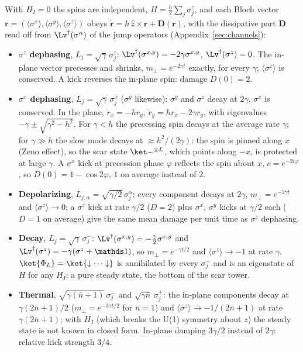 With $H_I = 0$ the spins are independent, $H = \tfrac h2\sum_j\sigma^z_j$, and each Bloch vector $\mathbf r = (\langle\sigma^x\rangle, \langle\sigma^y\rangle, \langle\sigma^z\rangle)$ obeys $\dot{\mathbf r} = h\,\hat z\times\mathbf r + \mathbf D(\mathbf r)$, with the dissipative part $\mathbf D$ read off from $\Lv^\dagger(\sigma^\alpha)$ of the jump operators (Appendix~\ref{sec:channels}):
\begin{itemize}
\item \textbf{$\sigma^z$ dephasing}, $L_j = \sqrt\gamma\,\sigma^z_j$: $\Lv^\dagger(\sigma^{x,y}) = -2\gamma\sigma^{x,y}$, $\Lv^\dagger(\sigma^z) = 0$. The in-plane vector precesses and shrinks, $m_\perp = e^{-2\gamma t}$ exactly, for every $\gamma$; $\langle\sigma^z\rangle$ is conserved. A kick reverses the in-plane spin: damage $D(0) = 2$.
\item \textbf{$\sigma^x$ dephasing}, $L_j = \sqrt\gamma\,\sigma^x_j$ ($\sigma^y$ likewise): $\sigma^y$ and $\sigma^z$ decay at $2\gamma$, $\sigma^x$ is conserved. In the plane, $\dot r_x = -hr_y$, $\dot r_y = hr_x - 2\gamma r_y$, with eigenvalues $-\gamma \pm \sqrt{\gamma^2 - h^2}$. For $\gamma < h$ the precessing spin decays at the average rate $\gamma$; for $\gamma \gg h$ the slow mode decays at $\approx h^2/(2\gamma)$: the spin is pinned along $x$ (Zeno effect), so the scar state $\ket-^{\otimes L}$, which points along $-x$, is protected at large $\gamma$. A $\sigma^x$ kick at precession phase $\varphi$ reflects the spin about $x$, $c = e^{-2i\varphi}$, so $D(0) = 1 - \cos2\varphi$, $1$ on average instead of $2$.
\item \textbf{Depolarizing}, $L_{j,\alpha} = \sqrt{\gamma/2}\,\sigma^\alpha_j$: every component decays at $2\gamma$, $m_\perp = e^{-2\gamma t}$ and $\langle\sigma^z\rangle \to 0$; a $\sigma^z$ kick at rate $\gamma/2$ ($D = 2$) plus $\sigma^x$, $\sigma^y$ kicks at $\gamma/2$ each ($D = 1$ on average) give the same mean damage per unit time as $\sigma^z$ dephasing.
\item \textbf{Decay}, $L_j = \sqrt\gamma\,\sigma^-_j$: $\Lv^\dagger(\sigma^{x,y}) = -\tfrac\gamma2\sigma^{x,y}$ and $\Lv^\dagger(\sigma^z) = -\gamma(\sigma^z + \mathds 1)$, so $m_\perp = e^{-\gamma t/2}$ and $\langle\sigma^z\rangle \to -1$ at rate $\gamma$. $\ket{\Phi_L} = \ket{\downarrow\cdots\downarrow}$ is annihilated by every $\sigma^-_j$ and is an eigenstate of $H$ for any $H_I$: a pure steady state, the bottom of the scar tower.
\item \textbf{Thermal}, $\sqrt{\gamma(\bar n+1)}\,\sigma^-_j$ and $\sqrt{\gamma\bar n}\,\sigma^+_j$: the in-plane components decay at $\gamma(2\bar n+1)/2$ ($m_\perp = e^{-3\gamma t/2}$ for $\bar n = 1$) and $\langle\sigma^z\rangle \to -1/(2\bar n+1)$ at rate $\gamma(2\bar n+1)$; with $H_I$ (which breaks the U(1) symmetry about $z$) the steady state is not known in closed form. In-plane damping $3\gamma/2$ instead of $2\gamma$: relative kick strength $3/4$.
\end{itemize}
